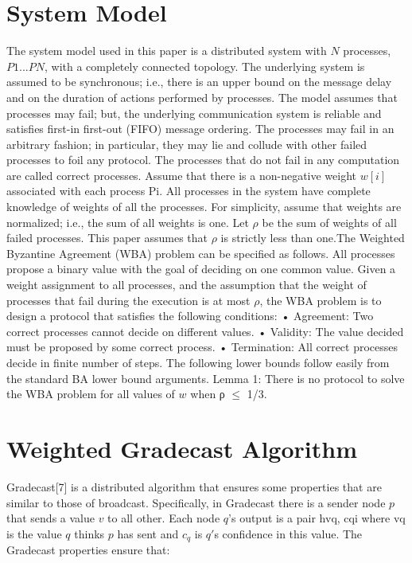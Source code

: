 \documentclass[conference]{IEEEtran}
\begin{document}
\section{System Model}
The system model used in this paper is a distributed system
with $N$ processes, $P1...PN$, with a completely connected topology. The underlying system is assumed to be synchronous; i.e.,
there is an upper bound on the message delay and on the duration of actions performed by processes. The model assumes
that processes may fail; but, the underlying communication
system is reliable and satisfies first-in first-out (FIFO) message
ordering. The processes may fail in an arbitrary fashion; in
particular, they may lie and collude with other failed processes
to foil any protocol. The processes that do not fail in any
computation are called correct processes. Assume that there
is a non-negative weight $w[i]$ associated with each process
Pi. All processes in the system have complete knowledge
of weights of all the processes. For simplicity, assume that
weights are normalized; i.e., the sum of all weights is one.
Let $ρ$ be the sum of weights of all failed processes. This paper
assumes that $ρ$ is strictly less than one.The Weighted Byzantine Agreement (WBA) problem can be specified as follows. All processes propose a binary value with the goal of deciding on one common value. Given a
weight assignment to all processes, and the assumption that
the weight of processes that fail during the execution is at most
$ρ$, the WBA problem is to design a protocol that satisfies the
following conditions:
• Agreement: Two correct processes cannot decide on
different values.
• Validity: The value decided must be proposed by some
correct process.
• Termination: All correct processes decide in finite number of steps.
The following lower bounds follow easily from the standard
BA lower bound arguments.
Lemma 1: There is no protocol to solve the WBA problem
for all values of $w$ when ρ $\leq$ 1/3.


\section{Weighted Gradecast Algorithm}
Gradecast[7] is a distributed algorithm that ensures some properties that are similar to those of broadcast. Specifically, in Gradecast there is a sender node $p$ that sends a value $v$ to all other. Each node $q’$s output is a pair hvq, cqi where vq is the value $q$ thinks $p$ has sent and $c_q$ is $q'$s confidence in this value. The Gradecast properties ensure that:
\end{document}
